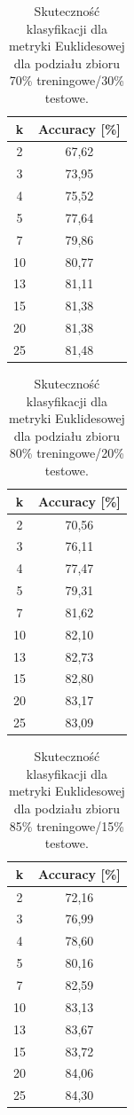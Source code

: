 \documentclass{classrep}
\begin{document}
\begin{table}[h!]
	\centering
	\begin{tabular} {c c}
		\hline
		\textbf{k} &\textbf{Accuracy [\%]} \\ [0.5ex] 
		\hline
		\hline 
		2 & 67,62 \\ 
		3 & 73,95 \\
		4 & 75,52 \\
		5 & 77,64 \\
		7 & 79,86 \\
		10 & 80,77  \\
		13 & 81,11 \\ 
		15 & 81,38 \\
		20 & 81,38 \\
		25 & 81,48 \\
		\hline
	\end{tabular}
	\caption{Skuteczność klasyfikacji dla metryki Euklidesowej dla podziału zbioru 70\% treningowe/30\% testowe. }
\end{table}

\begin{table}[h!]
	\centering
	\begin{tabular} {c c}
		\hline
		\textbf{k} & \textbf{Accuracy [\%]} \\ [0.5ex] 
		\hline
		\hline 
		2 & 70,56 \\ 
		3 & 76,11 \\
		4 & 77,47 \\
		5 & 79,31 \\
		7 & 81,62 \\
		10 & 82,10  \\
		13 & 82,73 \\ 
		15 & 82,80 \\
		20 & 83,17 \\
		25 & 83,09 \\
		\hline
	\end{tabular}
	\caption{Skuteczność klasyfikacji dla metryki Euklidesowej dla podziału zbioru 80\% treningowe/20\% testowe. }
\end{table}

\begin{table}[h!]
	\centering
	\begin{tabular} {c c}
		\hline
		\textbf{k} & \textbf{Accuracy [\%]} \\ [0.5ex] 
		\hline
		\hline 
		2 & 72,16 \\ 
		3 & 76,99 \\
		4 & 78,60 \\
		5 & 80,16 \\
		7 & 82,59 \\
		10 & 83,13  \\
		13 & 83,67 \\ 
		15 & 83,72 \\
		20 & 84,06 \\
		25 & 84,30 \\
		\hline
	\end{tabular}
	\caption{Skuteczność klasyfikacji dla metryki Euklidesowej dla podziału zbioru 85\% treningowe/15\% testowe. }
\end{table}
\end{document}
